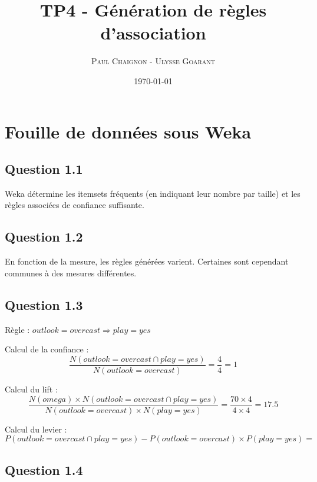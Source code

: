 \documentclass[a4paper,12pt]{article}
\title{TP4 - Génération de règles d'association}
\author{\textsc{Paul Chaignon} - \textsc{Ulysse Goarant}}
\date{\today}
\begin{document}
\maketitle

\section{Fouille de données sous Weka}

\subsection*{Question 1.1}

Weka détermine les itemsets fréquents (en indiquant leur nombre par taille) et les règles associées de confiance suffisante.


\subsection*{Question 1.2}

En fonction de la mesure, les règles générées varient.
Certaines sont cependant communes à des mesures différentes.


\subsection*{Question 1.3}

Règle : $outlook=overcast \Rightarrow play=yes$

Calcul de la confiance :
\begin{displaymath}
	\frac{N(outlook=overcast \cap play=yes)}{N(outlook=overcast)} = \frac{4}{4} = 1
\end{displaymath}

Calcul du lift :
\begin{displaymath}
	\frac{N(omega) \times N(outlook=overcast \cap play=yes)}{N(outlook=overcast) \times N(play=yes)} = \frac{70 \times 4}{4 \times 4} = 17.5
\end{displaymath}

Calcul du levier :
\begin{displaymath}
	P(outlook=overcast \cap play=yes) - P(outlook=overcast) \times P(play=yes) =
\end{displaymath}


\subsection*{Question 1.4}
\end{document}
